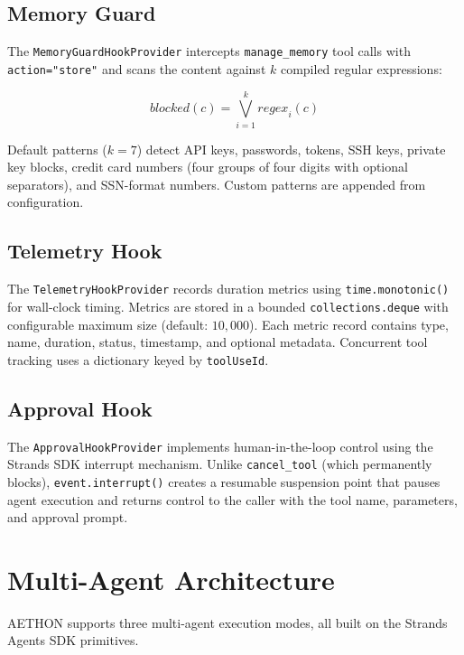 \documentclass[9pt,twocolumn,letterpaper]{extarticle}
\begin{document}
\subsection{Memory Guard}

The \texttt{MemoryGuardHookProvider} intercepts \texttt{manage\_memory} tool calls with \texttt{action="store"} and scans the content against $k$ compiled regular expressions:

\begin{equation}
\textit{blocked}(c) = \bigvee_{i=1}^{k} \textit{regex}_i(c)
\label{eq:memguard}
\end{equation}

Default patterns ($k{=}7$) detect API keys, passwords, tokens, SSH keys, private key blocks, credit card numbers (four groups of four digits with optional separators), and SSN-format numbers.
Custom patterns are appended from configuration.

\subsection{Telemetry Hook}

The \texttt{TelemetryHookProvider} records duration metrics using \texttt{time.monotonic()} for wall-clock timing.
Metrics are stored in a bounded \texttt{collections.deque} with configurable maximum size (default: $10{,}000$).
Each metric record contains type, name, duration, status, timestamp, and optional metadata.
Concurrent tool tracking uses a dictionary keyed by \texttt{toolUseId}.

\subsection{Approval Hook}

The \texttt{ApprovalHookProvider} implements human-in-the-loop control using the Strands SDK interrupt mechanism.
Unlike \texttt{cancel\_tool} (which permanently blocks), \texttt{event.interrupt()} creates a resumable suspension point that pauses agent execution and returns control to the caller with the tool name, parameters, and approval prompt.

\section{Multi-Agent Architecture}
\label{sec:multiagent}

AETHON supports three multi-agent execution modes, all built on the Strands Agents SDK primitives.
\end{document}
